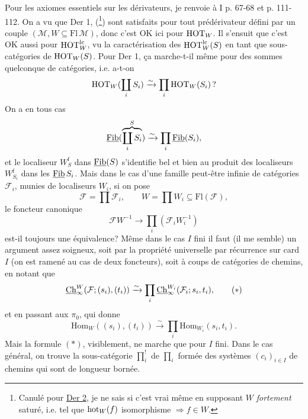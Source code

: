 Pour les axiomes essentiels sur les dérivateurs, je renvoie à I p. 67-68 et p. 111-112. On a vu que Der 1,  (\footnote[66]{Canulé pour \underline{Der 2}, je ne sais si c'est vrai même en supposant $W$ \textit{fortement} saturé, i.e. tel que $\mathrm{hot}_W(f)$ isomorphisme $\Longrightarrow f\in W$.}) sont satisfaits pour tout prédérivateur défini par un couple $(\mathcal{M},W\subseteq\mathrm{Fl}\,\mathcal{M})$, donc c'est OK ici pour $\mathrm{HOT}_W$. Il s'ensuit que c'est OK aussi pour $\mathrm{HOT}_W^{\mathrm{lc}}$, vu la caractérisation des $\mathrm{HOT}_W^{\mathrm{lc}}(S)$ en tant que sous-catégories de $\mathrm{HOT}_W(S)$. Pour Der 1, ça marche-t-il même pour des sommes quelconque de catégories, i.e. a-t-on %
\[ \mathrm{HOT}_W(\coprod_i S_i) \xrightarrow{\sim} \prod_i \mathrm{HOT}_W(S_i)\,? \]
On a en tous cas
\[ \underline{\mathrm{Fib}}(\overbrace{\coprod\limits_i S_i}^{S}) \xrightarrow{\sim} \prod_i \underline{\mathrm{Fib}}(S_i), \]
et le localiseur $W_S^{\mathrm{f}}$ dans $\underline{\mathrm{Fib}}(S)$ s'identifie
bel et bien au produit des localiseurs $W_{S_i}^{\mathrm{f}}$ dans les $\underline{\mathrm{Fib}}\,S_i$. Mais dans le cas d'une famille peut-être infinie de catégories $\mathcal{F}_i$, munies de localiseurs $W_i$, si on pose
\[ \mathcal{F} = \prod\mathcal{F}_i, \qquad W = \prod W_i \subseteq \mathrm{Fl}(\mathcal{F}), \]
le foncteur canonique
\[ \mathcal{F}W^{-1} \longrightarrow \prod_i(\mathcal{F}_iW_i^{-1}) \]
est-il toujours une équivalence? Même dans le cas $I$ fini il faut (il me semble) un argument assez soigneux, soit par la propriété universelle par récurrence sur card\,$I$ (on est ramené au cas de deux foncteurs), soit à coups de catégories de chemins, en notant que
\[ \underline{\mathrm{Ch}}_\infty^W(\mathcal{F};(s_i),(t_i)) \xrightarrow{\sim} \prod_i \underline{\mathrm{Ch}}_\infty^{W_i}(\mathcal{F}_i;s_i,t_i), \tag*{$(*)$} \]
et en passant aux $\pi_0$, qui donne
\[ \mathrm{Hom}_W((s_i),(t_i)) \xrightarrow{\sim} \prod_i \mathrm{Hom}_{W_i}(s_i,t_i). \]
Mais la formule $(*)$, visiblement, ne marche que pour $I$ fini. Dans le cas général, on trouve la sous-catégorie $\prod_i^!$ de $\prod_i$ formée des systèmes $(c_i)_{i\in I}$ de chemins qui sont de longueur bornée.

